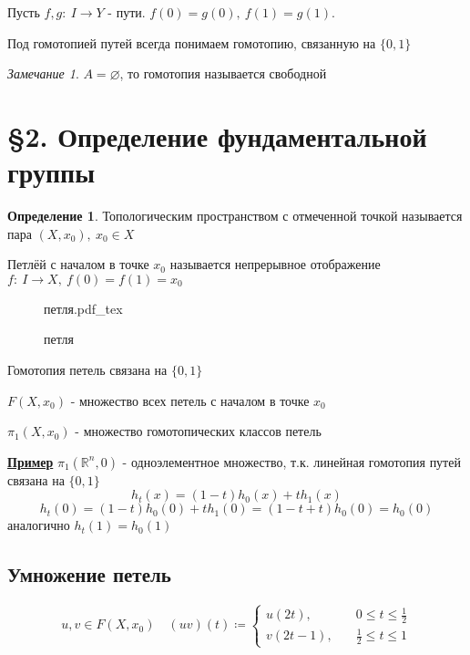 \documentclass[a4paper]{article}
\newcommand{\incfig}[1]{%
\def\svgwidth{\columnwidth}
{#1.pdf_tex}
}
\theoremstyle{definition}
\newtheorem*{definition}{Определение}
\theoremstyle{remark}
\newtheorem*{remark}{Замечание}
\begin{document}
\begin{tcolorbox}[title=Гомотопия путей]
    Пусть $ f,g : \ I \to Y $ - пути. $ f(0) = g(0), \ f(1) = g(1) $.

    Под гомотопией путей всегда понимаем гомотопию, связанную на $ \{ 0, 1 \} $ 
\end{tcolorbox}

\begin{tcolorbox}[title=Свободная гомотопия]
    \begin{remark}
        $ A = \varnothing $, то гомотопия называется свободной
    \end{remark}
\end{tcolorbox}

\section*{\centering \S 2. Определение фундаментальной группы}
\begin{tcolorbox}
    \begin{definition}
        Топологическим пространством с отмеченной точкой называется пара
        $ (X, x_0), \ x_0 \in X $ 
        
        Петлёй с началом в точке $ x_0 $ называется непрерывное отображение
        $ f: \ I \to X, \ f(0) = f(1) = x_0 $ 
    \end{definition}
\end{tcolorbox}

\begin{figure}[ht]
    \centering
    \incfig{петля}
    \caption{петля}
    \label{fig:петля}
\end{figure}
\newpage

Гомотопия петель связана на $ \{ 0, 1 \} $ 

$ F(X, x_0) $ - множество всех петель с началом в точке $ x_0 $ 

$ \pi_1(X, x_0) $ - множество гомотопических классов петель

\textbf{\underline{Пример}} $ \pi_1(\mathbb{R}^{n}, 0) $ - одноэлементное множество,
т.к. линейная гомотопия путей связана на $ \{ 0, 1 \} $ 
\[
    h_t(x) = (1-t)h_0(x) + t h_1(x)
\]
\[
    h_t(0) = (1-t)h_0(0) + t h_1(0) = (1-t+t)h_0(0) = h_0(0)
\]
аналогично $ h_t(1) = h_0(1) $ 

\subsection*{Умножение петель}
\[
    u,v \in F(X, x_0) \quad (uv)(t) \coloneqq
    \begin{cases}
        u(2t), &\quad 0 \leq t \leq \frac{1}{2} \\
        v(2t-1), &\quad \frac{1}{2} \leq t \leq 1
    \end{cases}
\]
\newpage
\end{document}
